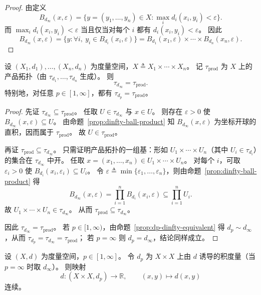 \documentclass[lang=cn,a4paper,newtx,section]{elegantbook}
\begin{document}
\begin{proof}
  由定义
  \[
    B_{d_\infty}(x,\varepsilon)=\{y=(y_1,\dots,y_n)\in X:\max_i d_i(x_i,y_i)<\varepsilon\}.
  \]
  而 $\max_i d_i(x_i,y_i)<\varepsilon$ 当且仅当对每个 $i$ 都有 $d_i(x_i,y_i)<\varepsilon$。
  因此
  \[
    B_{d_\infty}(x,\varepsilon)=\{y:\forall i,\ y_i\in B_{d_i}(x_i,\varepsilon)\}
    =B_{d_1}(x_1,\varepsilon)\times\cdots\times B_{d_n}(x_n,\varepsilon).
  \]
\end{proof}

\begin{theorem}\label{thm:finite-product-topology-metric}
  设 $(X_1,d_1),\dots,(X_n,d_n)$ 为度量空间，$X\triangleq X_1\times\cdots\times X_n$。
  记 $\tau_{\mathrm{prod}}$ 为 $X$ 上的产品拓扑（由 $\tau_{d_1},\dots,\tau_{d_n}$ 生成）。
  则
  \[
    \tau_{d_\infty}=\tau_{\mathrm{prod}}.
  \]
  特别地，对任意 $p\in[1,\infty]$，都有 $\tau_{d_p}=\tau_{\mathrm{prod}}$。
\end{theorem}

\begin{proof}
  先证 $\tau_{d_\infty}\subseteq\tau_{\mathrm{prod}}$。
  任取 $U\in\tau_{d_\infty}$ 与 $x\in U$。
  则存在 $\varepsilon>0$ 使 $B_{d_\infty}(x,\varepsilon)\subseteq U$。
  由命题~\ref{prop:dinfty-ball-product} 知 $B_{d_\infty}(x,\varepsilon)$ 为坐标开球的直积，因而属于 $\tau_{\mathrm{prod}}$。
  故 $U\in\tau_{\mathrm{prod}}$。

  再证 $\tau_{\mathrm{prod}}\subseteq\tau_{d_\infty}$。
  只需证明产品拓扑的一组基：形如 $U_1\times\cdots\times U_n$（其中 $U_i\in\tau_{d_i}$）的集合在 $\tau_{d_\infty}$ 中开。
  任取 $x=(x_1,\dots,x_n)\in U_1\times\cdots\times U_n$。
  对每个 $i$，可取 $\varepsilon_i>0$ 使 $B_{d_i}(x_i,\varepsilon_i)\subseteq U_i$。
  令 $\varepsilon\triangleq\min\{\varepsilon_1,\dots,\varepsilon_n\}$，则由命题~\ref{prop:dinfty-ball-product} 得
  \[
    B_{d_\infty}(x,\varepsilon)=\prod_{i=1}^{n}B_{d_i}(x_i,\varepsilon)\subseteq\prod_{i=1}^{n}U_i.
  \]
  故 $U_1\times\cdots\times U_n\in\tau_{d_\infty}$。
  从而 $\tau_{\mathrm{prod}}\subseteq\tau_{d_\infty}$。

  因此 $\tau_{d_\infty}=\tau_{\mathrm{prod}}$。
  若 $p\in[1,\infty)$，由命题~\ref{prop:dp-dinfty-equivalent} 得 $d_p\sim d_\infty$，从而 $\tau_{d_p}=\tau_{d_\infty}=\tau_{\mathrm{prod}}$；
  若 $p=\infty$ 则 $d_p=d_\infty$，结论同样成立。
\end{proof}

\begin{proposition}\label{prop:distance-function-continuous}
  设 $(X,d)$ 为度量空间，$p\in[1,\infty]$。
  令 $d_p$ 为 $X\times X$ 上由 $d$ 诱导的积度量（当 $p=\infty$ 时取 $d_\infty$）。
  则映射
  \[
    d:(X\times X,d_p)\to\mathbb{R},\qquad (x,y)\mapsto d(x,y)
  \]
  连续。
\end{proposition}
\end{document}
